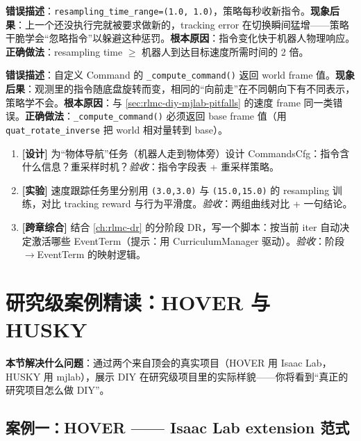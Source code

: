 \begin{pitfall}
\textbf{错误描述}：\verb|resampling_time_range=(1.0, 1.0)|，策略每秒收新指令。\textbf{现象后果}：上一个还没执行完就被要求做新的，tracking error 在切换瞬间猛增——策略干脆学会“忽略指令”以躲避这种惩罚。\textbf{根本原因}：指令变化快于机器人物理响应。\textbf{正确做法}：resampling time $\ge$ 机器人到达目标速度所需时间的 2 倍。
\end{pitfall}

\begin{pitfall}
\textbf{错误描述}：自定义 Command 的 \verb|_compute_command()| 返回 world frame 值。\textbf{现象后果}：观测里的指令随底盘旋转而变，相同的“向前走”在不同朝向下有不同表示，策略学不会。\textbf{根本原因}：与 \cref{sec:rlmc-diy-mjlab-pitfalls} 的速度 frame 同一类错误。\textbf{正确做法}：\verb|_compute_command()| 必须返回 base frame 值（用 \verb|quat_rotate_inverse| 把 world 相对量转到 base）。
\end{pitfall}

\begin{practice}
\begin{enumerate}
\item \textbf{[设计]} 为“物体导航”任务（机器人走到物体旁）设计 CommandsCfg：指令含什么信息？重采样时机？\emph{验收}：指令字段表 + 重采样策略。
\item \textbf{[实验]} 速度跟踪任务里分别用 \verb|(3.0,3.0)| 与 \verb|(15.0,15.0)| 的 resampling 训练，对比 tracking reward 与行为平滑度。\emph{验收}：两组曲线对比 + 一句结论。
\item \textbf{[跨章综合]} 结合 \cref{ch:rlmc-dr} 的分阶段 DR，写一个脚本：按当前 iter 自动决定激活哪些 EventTerm（提示：用 CurriculumManager 驱动）。\emph{验收}：阶段$\to$EventTerm 的映射逻辑。
\end{enumerate}
\end{practice}

\section{研究级案例精读：HOVER 与 HUSKY}
\label{sec:rlmc-diy-cases}

\textbf{本节解决什么问题}：通过两个来自顶会的真实项目（HOVER 用 Isaac Lab，HUSKY 用 mjlab），展示 DIY 在研究级项目里的实际样貌——你将看到“真正的研究项目怎么做 DIY”。

\subsection{案例一：HOVER —— Isaac Lab extension 范式}
\label{sec:rlmc-diy-hover}

